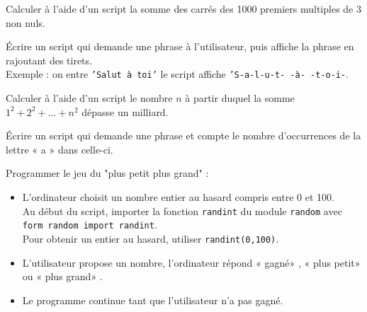 \begin{exercice}
    Calculer à l'aide d'un script la somme des carrés des 1000 premiers multiples de 3 non nuls.
\end{exercice}

\begin{exercice}
    \'Ecrire un script qui demande une phrase à l'utilisateur, puis affiche la phrase en rajoutant des tirets.\\
    Exemple : on entre \texttt{'Salut à toi'} le script affiche \texttt{'S-a-l-u-t- -à- -t-o-i-}.
\end{exercice}

\begin{exercice}
    Calculer à l'aide d'un script le nombre $n$ à partir duquel la somme $1^2+2^2+\ldots+n^2$ dépasse un milliard.
\end{exercice}

\begin{exercice}
    \'Ecrire un script qui demande une phrase et compte le nombre d'occurrences de la lettre « a »  dans celle-ci.
\end{exercice}

\begin{exercice}
    Programmer le jeu du "plus petit plus grand" :
    \begin{itemize}
        \item   L'ordinateur choisit un nombre entier au hasard compris entre 0 et 100.\\
        Au début du script, importer la fonction \texttt{randint} du module \texttt{random} avec \texttt{form random import randint}.\\
        Pour obtenir un entier au hasard, utiliser \texttt{randint(0,100)}.
        \item   L'utilisateur propose un nombre, l'ordinateur répond « gagné» , « plus petit»  ou « plus grand» .
        \item   Le programme continue tant que l'utilisateur n'a pas gagné.
    \end{itemize}
\end{exercice}

